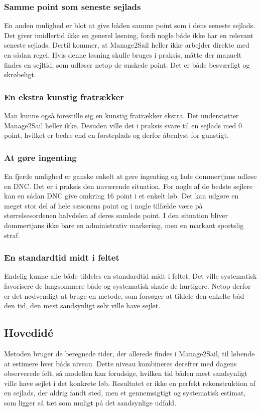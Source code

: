 \subsubsection*{Samme point som seneste sejlads}
En anden mulighed er blot at give båden samme point som i dens seneste sejlads. Det giver imidlertid ikke en generel løsning, fordi nogle både ikke har en relevant seneste sejlads. Dertil kommer, at Manage2Sail heller ikke arbejder direkte med en sådan regel. Hvis denne løsning skulle bruges i praksis, måtte der manuelt findes en sejltid, som udløser netop de ønskede point. Det er både besværligt og skrøbeligt.

\subsubsection*{En ekstra kunstig fratrækker}
Man kunne også forestille sig en kunstig fratrækker ekstra. Det understøtter Manage2Sail heller ikke. Desuden ville det i praksis svare til en sejlads med $0$ point, hvilket er bedre end en førsteplads og derfor åbenlyst for gunstigt.

\subsubsection*{At gøre ingenting}
En fjerde mulighed er ganske enkelt at gøre ingenting og lade dommertjans udløse en DNC. Det er i praksis den nuværende situation. For nogle af de bedste sejlere kan en sådan DNC give omkring $16$ point i et enkelt løb. Det kan udgøre en meget stor del af hele sæsonens point og i nogle tilfælde være på størrelsesordenen halvdelen af deres samlede point. I den situation bliver dommertjans ikke bare en administrativ markering, men en markant sportslig straf.

\subsubsection*{En standardtid midt i feltet}
Endelig kunne alle både tildeles en standardtid midt i feltet. Det ville systematisk favorisere de langsommere både og systematisk skade de hurtigere. Netop derfor er det nødvendigt at bruge en metode, som forsøger at tildele den enkelte båd den tid, den mest sandsynligt selv ville have sejlet.


\subsection*{Hovedidé}
Metoden bruger de beregnede tider, der allerede findes i Manage2Sail, til løbende at estimere hver båds niveau. Dette niveau kombineres derefter med dagens observerede felt, så modellen kan forudsige, hvilken tid båden mest sandsynligt ville have sejlet i det konkrete løb. Resultatet er ikke en perfekt rekonstruktion af en sejlads, der aldrig fandt sted, men et gennemsigtigt og systematisk estimat, som ligger så tæt som muligt på det sandsynlige udfald.

